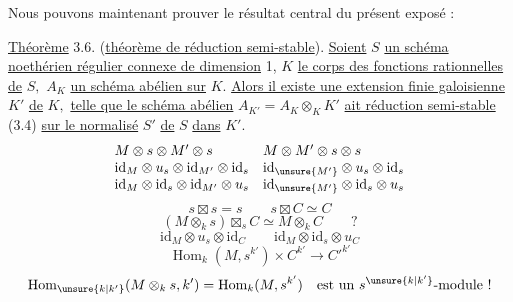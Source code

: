 Nous pouvons maintenant prouver le résultat central du présent exposé :

\uline{Théorème} 3.6. (\uline{théorème de réduction semi-stable}). \uline{Soient} \(S\) \uline{un schéma noethérien régulier connexe de dimension} 1, \(K\) \uline{le corps des fonctions rationnelles de} \(S,\) \(A_K\) \uline{un schéma abélien sur} \(K.\) \uline{Alors il existe une extension finie galoisienne} \(K'\) \uline{de} \(K,\) \uline{telle que le schéma abélien} \(A_{K'}=A_K\otimes_K K'\) \uline{ait réduction semi-stable} (3.4) \uline{sur le normalisé} \(S'\) \uline{de} \(S\) \uline{dans} \(K'.\)
\[
\begin{array}{ll}
M\otimes s\otimes M'\otimes s & M\otimes M'\otimes s\otimes s\\
\mathrm{id}_M\otimes u_s\otimes\mathrm{id}_{M'}\otimes\mathrm{id}_s & \mathrm{id}_{\unsure{M'}}\otimes u_s\otimes\mathrm{id}_s\\
\mathrm{id}_M\otimes\mathrm{id}_s\otimes\mathrm{id}_{M'}\otimes u_s & \mathrm{id}_{\unsure{M'}}\otimes\mathrm{id}_s\otimes u_s
\end{array}
\]
\[
s\boxtimes s=s\qquad s\boxtimes C\simeq C
\]
\[
\boxed{(M\otimes_k s)\boxtimes_s C\simeq M\otimes_k C}\qquad ?
\]
\[
\mathrm{id}_M\otimes u_s\otimes\mathrm{id}_C
\qquad
\mathrm{id}_M\otimes\mathrm{id}_s\otimes u_C
\]
\[
\operatorname{Hom}_k(M,s^{k'})\times C^{k'}\longrightarrow C'^{k'}
\]
\[
\operatorname{Hom}_{\unsure{k|k'}}(M\otimes_k s,k')=\operatorname{Hom}_k(M,s^{k'})
\quad\text{est un }s^{\unsure{k|k'}}\text{-module !}
\]

